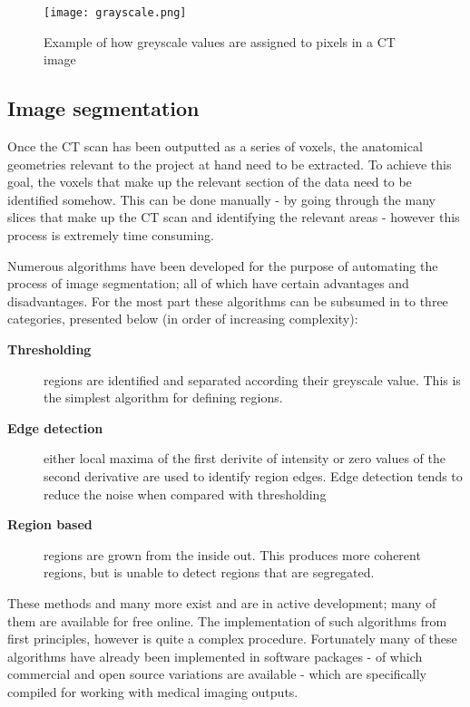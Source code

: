 \begin{figure} 
  \texttt{[image: grayscale.png]}
\caption{Example of how greyscale values are assigned to pixels in a CT image} \label{fig:greyscale}
\centering
\end{figure}
 
\subsection{Image segmentation} 

Once the CT scan has been outputted as a series of voxels, the anatomical geometries relevant to the project at hand need to be extracted. To achieve this goal, the voxels that make up the relevant section of the data need to be identified somehow. This can be done manually - by going through the many slices that make up the CT scan and identifying the relevant areas - however this process is extremely time consuming.

Numerous algorithms have been developed for the purpose of automating the process of image segmentation; all of which have certain advantages and disadvantages. For the most part these algorithms can be subsumed in to three categories, presented below (in order of increasing complexity):

\begin{description}

  \item[\textbf{Thresholding}] regions are identified and separated according their  greyscale value. This is the simplest algorithm for defining regions.
 
  \item[\textbf{Edge detection}] either local maxima of the first derivite of intensity or zero values of the second derivative are used to identify region edges. Edge detection tends to reduce the noise when compared with thresholding
 
  \item[\textbf{Region based}] regions are grown from the inside out. This produces more coherent regions, but is unable to detect regions that are segregated.

\end{description}

These methods and many more exist and are in active development; many of them are available for free online. The implementation of such algorithms from first principles, however is quite a complex procedure. Fortunately many of these algorithms have already been implemented in software packages - of which commercial and open source variations are available - which are specifically compiled for working with medical imaging outputs. 
 
